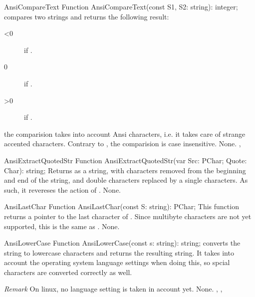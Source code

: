 

\begin{function}{AnsiCompareText}
\Declaration
Function AnsiCompareText(const S1, S2: string): integer;
\Description
\Description
{} compares two strings and returns the following
result:
\begin{description}
\item[<0]  if .
\item[0]  if .
\item[>0] if .
\end{description}
the comparision takes into account Ansi characters, i.e. it takes
care of strange accented characters. Contrary to ,
the comparision is case insensitive.
\Errors
None.
\SeeAlso
{}, 
\end{function}



\begin{function}{AnsiExtractQuotedStr}
\Declaration
Function AnsiExtractQuotedStr(var Src: PChar; Quote: Char): string;
\Description
{} Returns  as a string, with 
characters removed from the beginning and end of the string, and double
 characters replaced by a single  characters.
As such, it revereses the action of .
\Errors
None.
\SeeAlso
{}
\end{function}



\begin{function}{AnsiLastChar}
\Declaration
Function AnsiLastChar(const S: string): PChar;
\Description
This function returns a pointer to the last character of .
Since multibyte characters are not yet supported, this is the same
as .
\Errors
None.
\SeeAlso
{}
\end{function}



\begin{function}{AnsiLowerCase}
\Declaration
Function AnsiLowerCase(const s: string): string;
\Description
{} converts the string  to lowercase characters
and returns the resulting string.
It takes into account the operating system language
settings when doing this, so spcial characters are converted correctly as
well.

{\em Remark} On linux, no language setting is taken in account yet.
\Errors
None.
\SeeAlso
{}, , 
\end{function}

